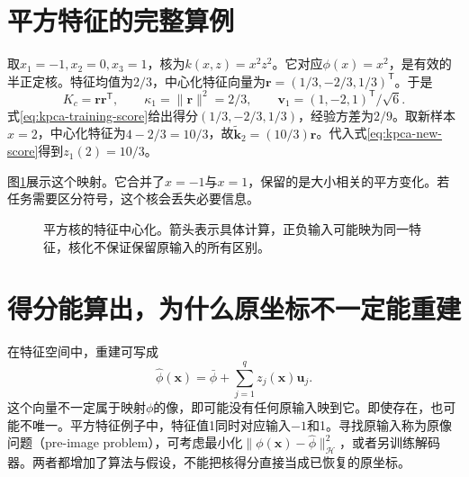 \section{平方特征的完整算例}
取$x_1=-1,x_2=0,x_3=1$，核为$k(x,z)=x^2z^2$。它对应$\phi(x)=x^2$，是有效的半正定核。特征均值为$2/3$，中心化特征向量为$\bm r=(1/3,-2/3,1/3)^{\mathsf T}$。于是
\begin{equation}
 K_c=\bm r\bm r^{\mathsf T},\qquad
 \kappa_1=\|\bm r\|^2=2/3,\qquad
 \bm v_1=(1,-2,1)^{\mathsf T}/\sqrt6.
\end{equation}
式\eqref{eq:kpca-training-score}给出得分$(1/3,-2/3,1/3)$，经验方差为$2/9$。取新样本$x=2$，中心化特征为$4-2/3=10/3$，故$\tilde{\bm k}_{2}=(10/3)\bm r$。代入式\eqref{eq:kpca-new-score}得到$z_1(2)=10/3$。

图\ref{fig:kpca-square-map}展示这个映射。它合并了$x=-1$与$x=1$，保留的是大小相关的平方变化。若任务需要区分符号，这个核会丢失必要信息。
\begin{figure}[htbp]
\centering
{}
\caption{平方核的特征中心化。箭头表示具体计算，正负输入可能映为同一特征，核化不保证保留原输入的所有区别。}
\label{fig:kpca-square-map}
\end{figure}

\section{得分能算出，为什么原坐标不一定能重建}
在特征空间中，重建可写成
\begin{equation}
 \hat\phi(\bm x)=\bar\phi+\sum_{j=1}^qz_j(\bm x)\bm u_j.
\end{equation}
这个向量不一定属于映射$\phi$的像，即可能没有任何原输入映到它。即使存在，也可能不唯一。平方特征例子中，特征值1同时对应输入$-1$和1。寻找原输入称为原像问题（pre-image problem），可考虑最小化$\|\phi(\bm x)-\hat\phi\|_{\mathcal H}^2$，或者另训练解码器。两者都增加了算法与假设，不能把核得分直接当成已恢复的原坐标。

